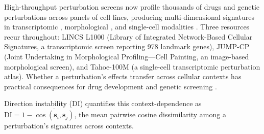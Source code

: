 \documentclass[11pt]{article}
\begin{document}
High-throughput perturbation screens now profile thousands of drugs and
genetic perturbations across panels of cell lines, producing
multi-dimensional signatures in transcriptomic
\citep{lamb2006connectivity, subramanian2017next}, morphological
\citep{bray2016cell}, and single-cell modalities \citep{tahoe2025}.  Three
resources recur throughout: LINCS L1000 (Library of Integrated Network-Based
Cellular Signatures, a transcriptomic screen reporting 978 landmark genes),
JUMP-CP (Joint Undertaking in Morphological Profiling---Cell Painting, an
image-based morphological screen), and Tahoe-100M (a single-cell
transcriptomic perturbation atlas).
Whether a perturbation's effects transfer across cellular contexts has
practical consequences for drug development and genetic screening
\citep{mcfarland2020context, tower2026confound}.

Direction instability (DI) quantifies this context-dependence as
$\mathrm{DI} = 1 - \overline{\cos(\mathbf{s}_i, \mathbf{s}_j)}$, the
mean pairwise cosine dissimilarity among a perturbation's signatures
across contexts.
\end{document}
